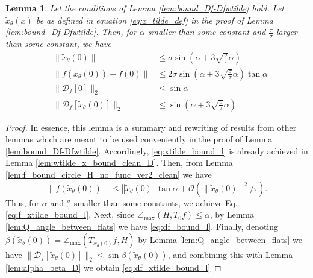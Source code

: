 \documentclass[12pt]{article}
\newtheorem{Lemma}[Theorem]{Lemma}
\theoremstyle{remark}
\newcommand{\DD}{\mathcal{D}}
\newcommand{\OO}{\mathcal{O}}
\newcommand{\norm}[1]{\left\Vert #1 \right\Vert}
\newcommand{\wtilde}[1]{\widetilde{#1}}
\newcommand{\maxangle}{\angle_{\max}}
\begin{document}
\begin{appendices}
\begin{Lemma}\label{lem:bounding_stuff}
Let the conditions of Lemma \ref{lem:bound_Df-Dfwtilde} hold. Let $\wtilde x_\theta(x)$ be as defined in equation \eqref{eq:x_tilde_def} in the proof of Lemma \ref{lem:bound_Df-Dfwtilde}.
Then, for $\alpha$ smaller than some constant and $\frac{\tau}{\sigma}$ larger than some constant, we have
\begin{align} \label{eq:xtilde_bound_l}
& \|\wtilde{x}_\theta(0)\| &\leq \sigma \sin (\alpha + 3\sqrt{\frac{\sigma}{\tau}}\alpha)
\\
\label{eq:f_xtilde_bound_l}
&\|f(\wtilde{x}_\theta(0)) - f(0)\| &\leq 2\sigma \sin (\alpha + 3\sqrt{\frac{\sigma}{\tau}}\alpha) \tan \alpha 
\\ \label{eq:df_bound_l}
&\|\DD_f[0]\|_2 &\leq \sin \alpha    
\\ \label{eq:df_xtilde_bound_l}
&\|\DD_f[\wtilde{x}_\theta(0)]\|_2 &\leq \sin (\alpha + 3\sqrt{\frac{\sigma}{\tau}}\alpha)
\end{align}

\end{Lemma}
\begin{proof}
In essence, this lemma is a summary and rewriting of results from other lemmas which are meant to be used conveniently in the proof of Lemma \ref{lem:bound_Df-Dfwtilde}. 
Accordingly, \eqref{eq:xtilde_bound_l} is already achieved in Lemma \ref{lem:wtilde_x_bound_clean_D}.
Then, from Lemma \ref{lem:f_bound_circle_H_no_func_ver2_clean} we have
\[
    \|f(\wtilde{x}_\theta(0))\| \leq \norm{\wtilde{x}_\theta(0)}\tan \alpha  +\OO(\|\wtilde{x}_\theta(0)\|^2/\tau)
.\]
Thus, for $\alpha$ and $\frac{\sigma}{\tau}$ smaller than some constants, we achieve Eq. \eqref{eq:f_xtilde_bound_l}.
Next, since $\maxangle(H, T_0f) \leq \alpha$, by Lemma \ref{lem:Q_angle_between_flats} we have \eqref{eq:df_bound_l}.
Finally, denoting $ \beta(\wtilde x_\theta(0)) =  \maxangle(T_{\wtilde x_\theta(0)}f, H)$ by Lemma \ref{lem:Q_angle_between_flats} we have $\|\DD_f[\wtilde{x}_\theta(0)]\|_2 \leq \sin \beta(\wtilde{x}_\theta(0))$, and combining this with Lemma \ref{lem:alpha_beta_D} we obtain \eqref{eq:df_xtilde_bound_l}

\end{proof}


\end{appendices}
\end{document}
